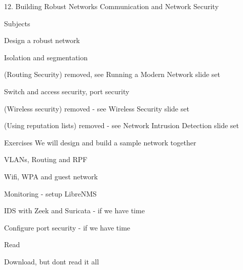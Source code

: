 \documentclass[Screen16to9,17pt]{foils}
\begin{document}
\mytitlepage
{12. Building Robust Networks}
{Communication and Network Security \the\year}



\begin{list1}
\item Subjects
\begin{list2}
\item Design a robust network
\item Isolation and segmentation
\item (Routing Security) removed, see Running a Modern Network slide set
\item Switch and access security, port security
\item (Wireless security) removed - see Wireless Security slide set
\item (Using reputation lists) removed - see Network Intrusion Detection slide set
\end{list2}
\item Exercises We will design and build a sample network together
\begin{list2}
\item VLANs, Routing and RPF
\item Wifi, WPA and guest network
\item Monitoring - setup LibreNMS
\item IDS with Zeek and Suricata - if we have time
\item Configure port security - if we have time
\end{list2}
\end{list1}



\begin{list2}
\item Read
\item {\small {}}
\item {\small {}}
\item Download, but dont read it all\\{\small {}}
\end{list2}
\end{document}
